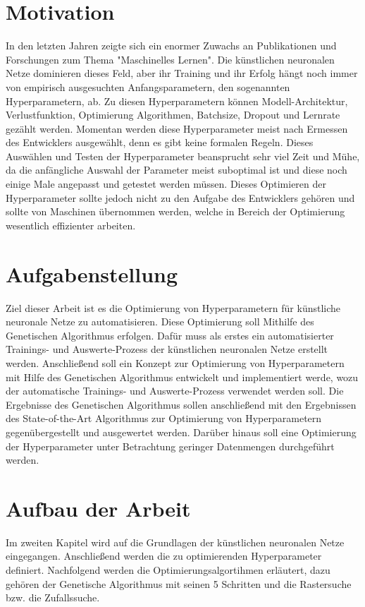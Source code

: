 \section{Motivation}
\label{sec:Motivation}
In den letzten Jahren zeigte sich ein enormer Zuwachs an Publikationen und Forschungen zum Thema "Maschinelles Lernen". Die künstlichen neuronalen Netze dominieren dieses Feld, aber ihr Training und ihr Erfolg hängt noch immer von empirisch ausgesuchten Anfangsparametern, den sogenannten Hyperparametern, ab. Zu diesen Hyperparametern können Modell-Architektur, Verlustfunktion, Optimierung Algorithmen, Batchsize, Dropout und Lernrate gezählt werden. Momentan werden diese Hyperparameter meist nach Ermessen des Entwicklers ausgewählt, denn es gibt keine formalen Regeln. Dieses Auswählen und Testen der Hyperparameter beansprucht sehr viel Zeit und Mühe, da die anfängliche Auswahl der Parameter meist suboptimal ist und diese noch einige Male angepasst und getestet werden müssen. Dieses Optimieren der Hyperparameter sollte jedoch nicht zu den Aufgabe des Entwicklers gehören und sollte von Maschinen übernommen werden, welche in Bereich der Optimierung wesentlich effizienter arbeiten. \cite[p.~337]{francois2017deep}

\section{Aufgabenstellung}
\label{sec:Aufgabenstellung}
Ziel dieser Arbeit ist es die Optimierung von Hyperparametern für künstliche neuronale Netze zu automatisieren. Diese Optimierung soll Mithilfe des Genetischen Algorithmus erfolgen. Dafür muss als erstes ein automatisierter Trainings- und Auswerte-Prozess der künstlichen neuronalen Netze erstellt werden. Anschließend soll ein Konzept zur Optimierung von Hyperparametern mit Hilfe des Genetischen Algorithmus entwickelt und implementiert werde, wozu der automatische Trainings- und Auswerte-Prozess verwendet werden soll. Die Ergebnisse des Genetischen Algorithmus sollen anschließend mit den Ergebnissen des State-of-the-Art Algorithmus zur Optimierung von Hyperparametern gegenübergestellt und ausgewertet werden. Darüber hinaus soll eine Optimierung der Hyperparameter unter Betrachtung geringer Datenmengen durchgeführt werden. 

\section{Aufbau der Arbeit}
\label{sec:Aufbau der Arbeit}
Im zweiten Kapitel wird auf die Grundlagen der künstlichen neuronalen Netze eingegangen. Anschließend werden die zu optimierenden Hyperparameter definiert. Nachfolgend werden die Optimierungsalgortihmen erläutert, dazu gehören der Genetische Algorithmus mit seinen 5 Schritten und die Rastersuche bzw. die Zufallssuche.

